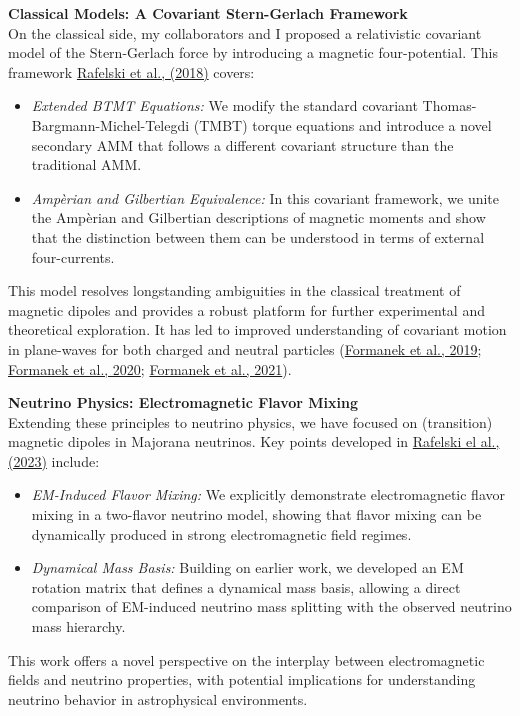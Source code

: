 \documentclass[11pt]{article}
\begin{document}
{\large\textbf{Classical Models: A Covariant Stern-Gerlach Framework}}\\
On the classical side, my collaborators and I proposed a relativistic covariant model of the Stern-Gerlach force by introducing a magnetic four-potential. This framework \href{https://doi.org/10.1140/epjc/s10052-017-5493-2}{Rafelski et al., (2018)} covers:
\begin{itemize}[leftmargin=1.5em,nosep]
    \item \emph{Extended BTMT Equations:} We modify the standard covariant Thomas-Bargmann-Michel-Telegdi (TMBT) torque equations and introduce a novel secondary AMM that follows a different covariant structure than the traditional AMM.
    \item \emph{Ampèrian and Gilbertian Equivalence:} In this covariant framework, we unite the Ampèrian and Gilbertian descriptions of magnetic moments and show that the distinction between them can be understood in terms of external four-currents.
\end{itemize}
This model resolves longstanding ambiguities in the classical treatment of magnetic dipoles and provides a robust platform for further experimental and theoretical exploration. It has led to improved understanding of covariant motion in plane-waves for both charged and neutral particles (\href{https://doi.org/10.1088/1361-6587/ab242e}{Formanek et al., 2019}; \href{https://doi.org/10.1103/PhysRevD.102.056015}{Formanek et al., 2020}; \href{https://doi.org/10.1103/PhysRevA.103.052218}{Formanek et al., 2021}).

{\large\textbf{Neutrino Physics: Electromagnetic Flavor Mixing}}\\
Extending these principles to neutrino physics, we have focused on (transition) magnetic dipoles in Majorana neutrinos. Key points developed in \href{https://doi.org/10.1142/S0217751X23501634}{Rafelski el al., (2023)} include:
\begin{itemize}[leftmargin=1.5em,nosep]
    \item \emph{EM-Induced Flavor Mixing:} We explicitly demonstrate electromagnetic flavor mixing in a two-flavor neutrino model, showing that flavor mixing can be dynamically produced in strong electromagnetic field regimes.
    \item \emph{Dynamical Mass Basis:} Building on earlier work, we developed an EM rotation matrix that defines a dynamical mass basis, allowing a direct comparison of EM-induced neutrino mass splitting with the observed neutrino mass hierarchy.
\end{itemize}
This work offers a novel perspective on the interplay between electromagnetic fields and neutrino properties, with potential implications for understanding neutrino behavior in astrophysical environments.
\end{document}
